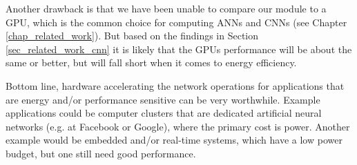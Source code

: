 Another drawback is that we have been unable to compare our module to a GPU, which is the common choice for computing ANNs and CNNs (see Chapter \ref{chap_related_work}). But based on the findings in Section \ref{sec_related_work_cnn} it is likely that the GPUs performance will be about the same or better, but will fall short when it comes to energy efficiency. 

Bottom line, hardware accelerating the network operations for applications that are energy and/or performance sensitive can be very worthwhile. Example applications could be computer clusters that are dedicated artificial neural networks (e.g. at Facebook or Google), where the primary cost is power. Another example would be embedded and/or real-time systems, which have a low power budget, but one still need good performance. 


